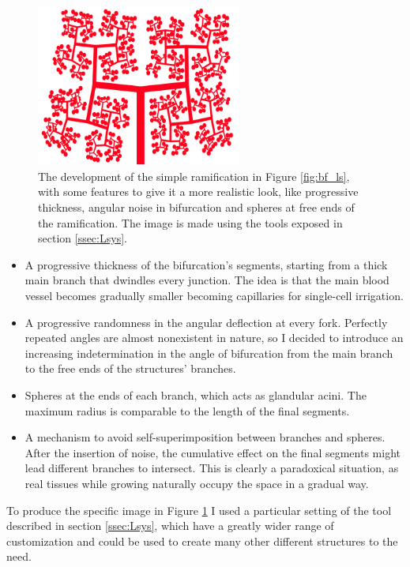 \documentclass[12pt,a4paper]{report}
\begin{document}
    \begin{figure}
        \centering
        \includegraphics[width = 0.6\textwidth]{images/ram_feat}
        \caption{The development of the simple ramification in Figure \ref{fig:bf_ls}, with some features to give it a more realistic look, like progressive thickness, angular noise in bifurcation and spheres at free ends of the ramification. The image is made using the tools exposed in section \ref{ssec:Lsys}.}
        \label{fig:ram_feat}
    \end{figure}

    \begin{itemize}
        \item A progressive thickness of the bifurcation's segments, starting from a thick main branch that dwindles every junction. The idea is that the main blood vessel becomes gradually smaller becoming capillaries for single-cell irrigation.
        \item A progressive randomness in the angular deflection at every fork. Perfectly repeated angles are almost nonexistent in nature, so I decided to introduce an increasing indetermination in the angle of bifurcation from the main branch to the free ends of the structures' branches.
        \item Spheres at the ends of each branch, which acts as glandular acini. The maximum radius is comparable to the length of the final segments.
        \item A mechanism to avoid self-superimposition between branches and spheres. After the insertion of noise, the cumulative effect on the final segments might lead different branches to intersect. This is clearly a paradoxical situation, as real tissues while growing naturally occupy the space in a gradual way.
    \end{itemize}

    To produce the specific image in Figure \ref{fig:ram_feat} I used a particular setting of the tool described in section \ref{ssec:Lsys}, which have a greatly wider range of customization and could be used to create many other different structures to the need.
\end{document}
